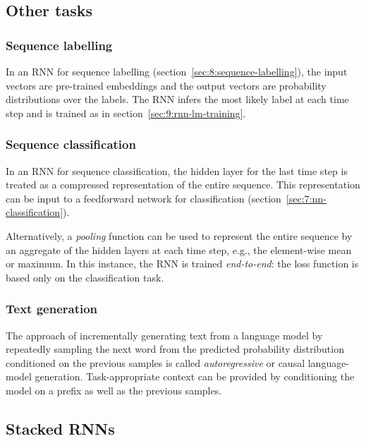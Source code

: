 \subsection{Other tasks}
\label{sec:9:rnn-other-tasks}

\subsubsection{Sequence labelling}

In an RNN for sequence labelling (section~\ref{sec:8:sequence-labelling}), the
input vectors are pre-trained embeddings and the output vectors are probability
distributions over the labels.
The RNN infers the most likely label at each time step and is trained as in
section~\ref{sec:9:rnn-lm-training}.

\subsubsection{Sequence classification}
\label{sec:9:rnn-sequence-classification}

In an RNN for sequence classification, the hidden layer for the last time step
is treated as a compressed representation of the entire sequence.
This representation can be input to a feedforward network for classification
(section~\ref{sec:7:nn-classification}).

Alternatively, a \textit{pooling} function can be used to represent the entire
sequence by an aggregate of the hidden layers at each time step, e.g., the
element-wise mean or maximum.
In this instance, the RNN is trained \textit{end-to-end}: the loss function is
based only on the classification task.

\subsubsection{Text generation}

The approach of incrementally generating text from a language model by
repeatedly sampling the next word from the predicted probability distribution
conditioned on the previous samples is called \textit{autoregressive} or causal
language-model generation.
Task-appropriate context can be provided by conditioning the model on a prefix
as well as the previous samples.

\subsection{Stacked RNNs}

